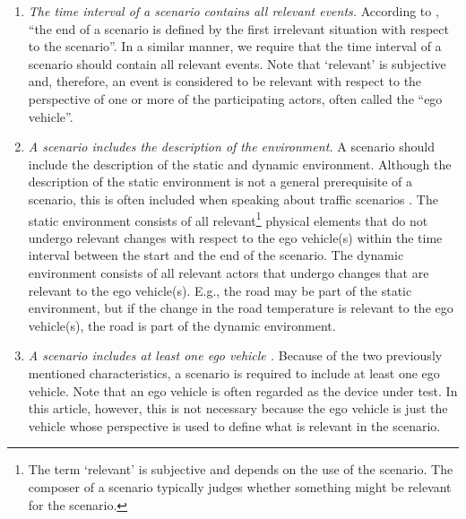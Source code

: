 \begin{enumerate}
	\item\textit{The time interval of a scenario contains all relevant events.}
	According to \textcite{geyer2014}, ``the end of a scenario is defined by the first irrelevant situation with respect to the scenario''. In a similar manner, we require that the time interval of a scenario should contain all relevant events. Note that `relevant' is subjective and, therefore, \cstarte an event is considered to be relevant with respect to the perspective of one or more of the participating actors, often called the ``ego vehicle''. \cende

	\item\textit{A scenario includes the description of the environment.}
	A scenario should include the description of the static and dynamic environment.
	Although the description of the static environment is not a general prerequisite of a scenario, this is often included when speaking about traffic scenarios \autocite{geyer2014, ulbrich2015, elrofai2016scenario, ebner2011identifying, althoff2017CommonRoad}.
	\cstartb The static environment consists of all relevant\footnote{\cstartf The term `relevant' is subjective and depends on the use of the scenario. The composer of a scenario typically judges whether something might be relevant for the scenario. \cendf} physical elements that do not undergo relevant changes with respect to the ego vehicle\cendb\cstartd (s) within the time interval between the start and the end of the scenario\cendd\cstartb. The dynamic environment consists of all relevant actors that \cendb\cstartd undergo \cendd\cstartb changes that are relevant to the ego vehicle\cendb\cstartd (s)\cendd\cstartb. E.g., the road may be part of the static environment, but if the change in the road temperature is relevant to the ego vehicle\cendb\cstartd (s)\cendd\cstartb, the road is part of the dynamic environment.\cendb
	
	\cstartb
	\item\textit{A scenario includes \cendb\cstartd at least one \cendd\cstartb ego vehicle \autocite{geyer2014, elrofai2016scenario}.}
	Because of the two previously mentioned characteristics, a scenario is required to include \cendb\cstartd at least one \cendd\cstartb ego vehicle. \cendb
	\cstarte Note that an ego vehicle is often regarded as the device under test. In this article, however, this is not necessary because the ego vehicle is just the vehicle whose perspective is used to define what is relevant in the scenario. \cende
	

\end{enumerate}
